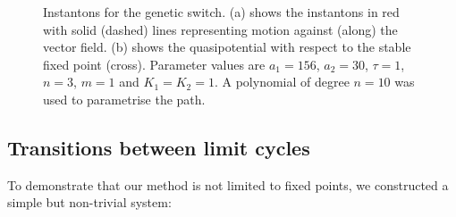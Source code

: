 \begin{figure}
\begin{subfigure}[b]{0.4\textwidth}
        \caption[Extending Cosserat rod]%
        {}    
        \label{fig:genetic switch quasi}
    \end{subfigure}    
    \caption[ ]
    {\small Instantons for the genetic switch. (a) shows the instantons
in red with solid (dashed) lines representing motion against (along)
the vector field. (b) shows the quasipotential with respect
to the stable fixed point (cross). Parameter values are $a_{1}=156$, $a_{2}=30$,
$\tau=1$, $n=3$, $m=1$ and $K_{1}=K_{2}=1$. A polynomial of degree $n=10$ was used to parametrise the path.} 
    \label{fig:genetic-switch-quasipotential}
\end{figure} 



\subsection{Transitions between limit cycles}

To demonstrate that our method is not limited to fixed points, we
constructed a simple but non-trivial system:


